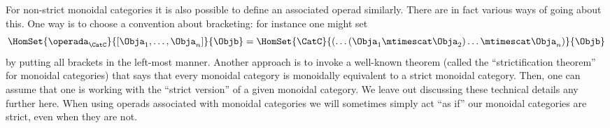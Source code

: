 



\begin{remark}
    \label{operad-from-monoidal}
    For non-strict monoidal categories it is also possible to define an associated operad similarly.
    There are in fact various ways of going about this.
    One way is to choose a convention about bracketing: for instance one might set
    \begin{equation}
        \HomSet{\operada_\CatC}{[\Obja_1,\ldots,\Obja_n]}{\Objb}=\HomSet{\CatC}{ ( \dots (\Obja_1 \mtimescat \Obja_2) \ldots \mtimescat \Obja_n)}{\Objb}
    \end{equation}
    by putting all brackets in the left-most manner.
    Another approach is to invoke a well-known theorem (called the ``strictification theorem'' for monoidal categories) that says that every monoidal category is monoidally equivalent to a strict monoidal category.
    Then, one can assume that one is working with the ``strict version'' of a given monoidal category.
    We leave out discussing these technical details any further here.
    When using operads associated with monoidal categories we will sometimes simply act ``as if'' our monoidal categories are strict, even when they are not.
\end{remark}

